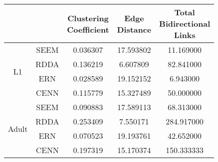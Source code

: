 \begin{tabular}{|c|c||c|c|c|}
\toprule
 &  & \thead{Clustering\\Coefficient} & \thead{Edge\\Distance} & \thead{Total\\Bidirectional\\Links} \\
\midrule
\multirow[c]{4}{*}{L1} & SEEM & 0.036307 & 17.593802 & 11.169000 \\
 & RDDA & 0.136219 & 6.607809 & 82.841000 \\
 & ERN & 0.028589 & 19.152152 & 6.943000 \\
 & CENN & 0.115779 & 15.327489 & 50.000000 \\
\cline{1-5}
\multirow[c]{4}{*}{Adult} & SEEM & 0.090883 & 17.589113 & 68.313000 \\
 & RDDA & 0.253409 & 7.550171 & 284.917000 \\
 & ERN & 0.070523 & 19.193761 & 42.652000 \\
 & CENN & 0.197319 & 15.170374 & 150.333333 \\
\cline{1-5}
\bottomrule
\end{tabular}
